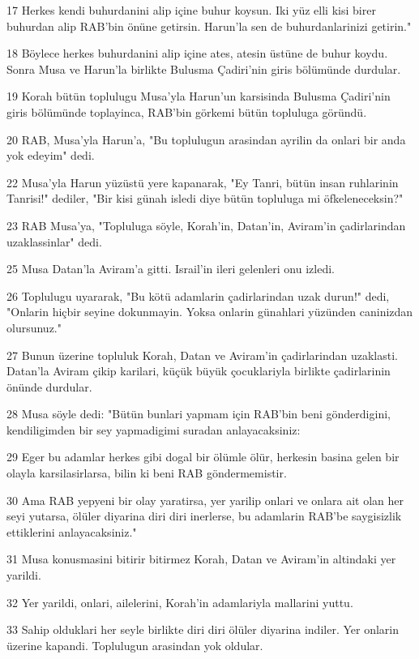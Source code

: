\par 17 Herkes kendi buhurdanini alip içine buhur koysun. Iki yüz elli kisi birer buhurdan alip RAB'bin önüne getirsin. Harun'la sen de buhurdanlarinizi getirin."
\par 18 Böylece herkes buhurdanini alip içine ates, atesin üstüne de buhur koydu. Sonra Musa ve Harun'la birlikte Bulusma Çadiri'nin giris bölümünde durdular.
\par 19 Korah bütün toplulugu Musa'yla Harun'un karsisinda Bulusma Çadiri'nin giris bölümünde toplayinca, RAB'bin görkemi bütün topluluga göründü.
\par 20 RAB, Musa'yla Harun'a, "Bu toplulugun arasindan ayrilin da onlari bir anda yok edeyim" dedi.
\par 22 Musa'yla Harun yüzüstü yere kapanarak, "Ey Tanri, bütün insan ruhlarinin Tanrisi!" dediler, "Bir kisi günah isledi diye bütün topluluga mi öfkeleneceksin?"
\par 23 RAB Musa'ya, "Topluluga söyle, Korah'in, Datan'in, Aviram'in çadirlarindan uzaklassinlar" dedi.
\par 25 Musa Datan'la Aviram'a gitti. Israil'in ileri gelenleri onu izledi.
\par 26 Toplulugu uyararak, "Bu kötü adamlarin çadirlarindan uzak durun!" dedi, "Onlarin hiçbir seyine dokunmayin. Yoksa onlarin günahlari yüzünden caninizdan olursunuz."
\par 27 Bunun üzerine topluluk Korah, Datan ve Aviram'in çadirlarindan uzaklasti. Datan'la Aviram çikip karilari, küçük büyük çocuklariyla birlikte çadirlarinin önünde durdular.
\par 28 Musa söyle dedi: "Bütün bunlari yapmam için RAB'bin beni gönderdigini, kendiligimden bir sey yapmadigimi suradan anlayacaksiniz:
\par 29 Eger bu adamlar herkes gibi dogal bir ölümle ölür, herkesin basina gelen bir olayla karsilasirlarsa, bilin ki beni RAB göndermemistir.
\par 30 Ama RAB yepyeni bir olay yaratirsa, yer yarilip onlari ve onlara ait olan her seyi yutarsa, ölüler diyarina diri diri inerlerse, bu adamlarin RAB'be saygisizlik ettiklerini anlayacaksiniz."
\par 31 Musa konusmasini bitirir bitirmez Korah, Datan ve Aviram'in altindaki yer yarildi.
\par 32 Yer yarildi, onlari, ailelerini, Korah'in adamlariyla mallarini yuttu.
\par 33 Sahip olduklari her seyle birlikte diri diri ölüler diyarina indiler. Yer onlarin üzerine kapandi. Toplulugun arasindan yok oldular.
